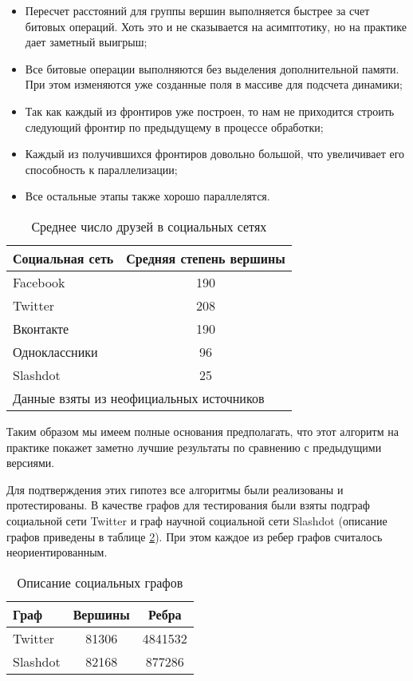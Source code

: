 \begin{itemize}
  \item Пересчет расстояний для группы вершин выполняется быстрее за счет битовых операций. Хоть это и не сказывается на асимптотику, но на практике дает заметный выигрыш; 
  \item Все битовые операции выполняются без выделения дополнительной памяти. При этом изменяются уже созданные поля в массиве для подсчета динамики;
  \item Так как каждый из фронтиров уже построен, то нам не приходится строить следующий фронтир по предыдущему в процессе обработки;
  \item Каждый из получившихся фронтиров довольно большой, что увеличивает его способность к параллелизации;
  \item Все остальные этапы также хорошо параллелятся.
\end{itemize}

\begin{table}[H]
\centering
\caption{Среднее число друзей в социальных сетях}

\begin{tabular}{l|c}  
\hline
Социальная сеть & Средняя степень вершины\\
\hline\hline
Facebook & 190 \\  
Twitter & 208  \\
Вконтакте & 190  \\
Одноклассники & 96  \\
Slashdot & 25  \\
\hline
\multicolumn{2}{l}{\footnotesize Данные взяты из неофициальных источников}\\
\end{tabular}
\label {table:algo_floyd_avg_vertex_degree}
\end{table}

Таким образом мы имеем полные основания предполагать, что этот алгоритм на практике покажет заметно лучшие результаты по сравнению с предыдущими версиями. 

Для подтверждения этих гипотез все алгоритмы были реализованы и протестированы. В качестве графов для тестирования были взяты подграф социальной сети Twitter и граф научной социальной сети Slashdot (описание графов приведены в таблице \ref{table:algo_floyd_graph_description}). При этом каждое из ребер графов считалось неориентированным. \FloatBarrier
\begin{table}[H]
\centering
\caption{Описание социальных графов}

\begin{tabular}{l|c|c} 
\hline 
Граф & Вершины & Ребра\\
\hline\hline
Twitter & 81306 & 4841532\\  
Slashdot & 82168 & 877286  \\
\hline
\end{tabular}

\label {table:algo_floyd_graph_description}
\end{table}

